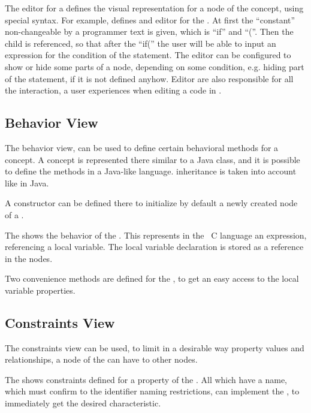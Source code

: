 The editor for a  defines the visual representation for a node of the concept, using special syntax. For example,  defines
and editor for the . At first the ``constant'' non-changeable by a programmer text is given, which is ``if'' and ``(''. Then
the child  is referenced, so that after the ``if('' the user will be able to input an expression for the condition of the  statement.
The editor can be configured to show or hide some parts of a node, depending on some condition, e.g. hiding  part of the  statement, if it 
is not defined anyhow. Editor are also responsible for all the interaction, a user experiences when editing a code in \jbmps.

\subsection{Behavior View}
The behavior view, can be used to define certain behavioral methods for a concept. A concept is represented there similar to a Java class, and
it is possible to define the methods in a Java-like language.  inheritance is taken into account like in Java. 

A  constructor can be defined there to initialize by default a newly created node of a .


The  shows the behavior of the  . This  represents in the
\mbp\ C language an expression, referencing a local variable. The local variable declaration is stored as a reference 
in the  nodes.

Two convenience methods are defined for the  , to get an easy access to the local variable properties.


\subsection{Constraints View}
The constraints view can be used, to limit in a desirable way  property values and relationships, a node of the  can 
have to other nodes.


The  shows constraints defined for a property  of the  .
All  which have a name, which must confirm to the identifier naming restrictions, can implement the ,
to immediately get the desired characteristic.

